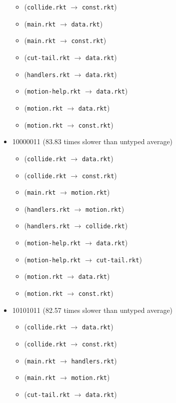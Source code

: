 \documentclass{article}
\newcommand{\mono}[1]{\texttt{#1}}
\begin{document}
\begin{itemize}
\begin{itemize}
  \item (\mono{collide.rkt} $\rightarrow$ \mono{const.rkt})
  \item (\mono{main.rkt} $\rightarrow$ \mono{data.rkt})
  \item (\mono{main.rkt} $\rightarrow$ \mono{const.rkt})
  \item (\mono{cut-tail.rkt} $\rightarrow$ \mono{data.rkt})
  \item (\mono{handlers.rkt} $\rightarrow$ \mono{data.rkt})
  \item (\mono{motion-help.rkt} $\rightarrow$ \mono{data.rkt})
  \item (\mono{motion.rkt} $\rightarrow$ \mono{data.rkt})
  \item (\mono{motion.rkt} $\rightarrow$ \mono{const.rkt})
  \end{itemize}
\item 10000011 (83.83 times slower than untyped average)
  \begin{itemize}
  \item (\mono{collide.rkt} $\rightarrow$ \mono{data.rkt})
  \item (\mono{collide.rkt} $\rightarrow$ \mono{const.rkt})
  \item (\mono{main.rkt} $\rightarrow$ \mono{motion.rkt})
  \item (\mono{handlers.rkt} $\rightarrow$ \mono{motion.rkt})
  \item (\mono{handlers.rkt} $\rightarrow$ \mono{collide.rkt})
  \item (\mono{motion-help.rkt} $\rightarrow$ \mono{data.rkt})
  \item (\mono{motion-help.rkt} $\rightarrow$ \mono{cut-tail.rkt})
  \item (\mono{motion.rkt} $\rightarrow$ \mono{data.rkt})
  \item (\mono{motion.rkt} $\rightarrow$ \mono{const.rkt})
  \end{itemize}
\item 10101011 (82.57 times slower than untyped average)
  \begin{itemize}
  \item (\mono{collide.rkt} $\rightarrow$ \mono{data.rkt})
  \item (\mono{collide.rkt} $\rightarrow$ \mono{const.rkt})
  \item (\mono{main.rkt} $\rightarrow$ \mono{handlers.rkt})
  \item (\mono{main.rkt} $\rightarrow$ \mono{motion.rkt})
  \item (\mono{cut-tail.rkt} $\rightarrow$ \mono{data.rkt})

\end{itemize}
\end{itemize}
\end{document}
